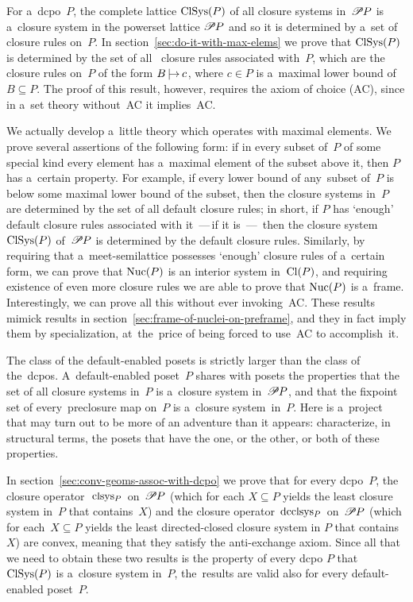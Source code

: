\documentclass[11pt,letterpaper]{article}
\begin{document}
\txtskip

For a~dcpo~$P$, the complete lattice $\mathop{\smash{\mathrm{ClSys}}}\nolimits(P)$ of all closure systems in~$\mathscr{P}\mspace{-1mu} P$
	is a~closure system in the powerset lattice $\mathscr{P}\mspace{-1mu} P$
and so it is determined by a~set of closure rules on~$P$.
In section~\ref{sec:do-it-with-max-elems}
we prove that $\mathop{\smash{\mathrm{ClSys}}}\nolimits(P)$ is determined
	by the set of all~ closure rules associated with~$P$,
which are the closure rules on~$P$ of the form $B\mspace{-2mu}\mathrel{{{|}\mspace{-3.5mu}{\rightarrow}}_{\!}}c\mspace{1mu}$,
where $c\in P$ is a~maximal lower bound of $B\subseteq P$.
The proof of this result, however, requires the axiom of choice (AC),
since in a~set theory without~AC it implies~AC.

We actually develop a~little theory which operates with maximal elements.
We prove several assertions of the following form:
if in every subset of~$P$ of some special kind
	every element has a~maximal element of the subset above it,
then $P$ has a~certain property.
For example, if every lower bound of any~subset of~$P$
	is below some maximal lower bound of the subset,
then the closure systems in~$P$ are determined by the set of all default closure rules;
in short, if $P$ has `enough' default closure rules associated with it%
\,---\,if it is \,---\,%
then the closure system $\mathop{\smash{\mathrm{ClSys}}}\nolimits(P)$ of~$\mathscr{P}\mspace{-1mu} P$
	is determined by the default closure rules.
Similarly, by requiring that a~meet-semilattice
	possesses `enough' closure rules of a~certain form,
we can prove that $\mathop{\smash{\mathrm{Nuc}}}\nolimits(P)$ is an interior system in~$\mathop{\smash{\mathrm{Cl}}}\nolimits(P)$,
and requiring existence of even more closure rules
	we are able to prove that $\mathop{\smash{\mathrm{Nuc}}}\nolimits(P)$ is a~frame.
Interestingly, we can prove all this without ever invoking~AC.
These results mimick results in section~\ref{sec:frame-of-nuclei-on-preframe},
and they in fact imply them by specialization,
at~the~price of being forced to use~AC to accomplish~it.

The class of the default-enabled posets is strictly larger than the class of the~dcpos.
A~default-enabled poset~$P$ shares with posets the properties
that the set of all closure systems in~$P$ is a~closure system in~$\mathscr{P}\mspace{-1mu} P$,
and that the fixpoint set of every~preclosure map on~$P$ is a~closure system~in~$P$.
Here is a~project that may turn out to be more of an adventure than it appears:
characterize, in structural terms,
	the posets that have the one, or the other, or both of these properties.

\txtskip

In section~\ref{sec:conv-geoms-assoc-with-dcpo} we prove that for every dcpo~$P$,
the closure operator~$\mspace{2mu}\mathop{\smash{\mathrm{clsys}}}\nolimits_P\mspace{2mu}$ on~$\mathscr{P}\mspace{-1mu} P$
    {\large(}which for each $X\subseteq P$
	yields the least closure system in~$P$ that contains~$X${\large)}
and the closure operator $\mspace{2mu}\mathop{\smash{\mathrm{dcclsys}}}\nolimits_P\mspace{2mu}$ on~$\mathscr{P}\mspace{-1mu} P$
    {\large(}which for each~$X\subseteq P$
	yields the least directed\nobreakdash-closed closure system in $P$ that contains~$X${\large)}
are convex,
meaning that they satisfy the anti-exchange axiom.
Since all that we need to obtain these two results
is the property of every dcpo $P$ that $\mathop{\smash{\mathrm{ClSys}}}\nolimits(P)$ is a~closure system in~$P$,
the~results are valid also for every default-enabled poset~$P$.
\end{document}
